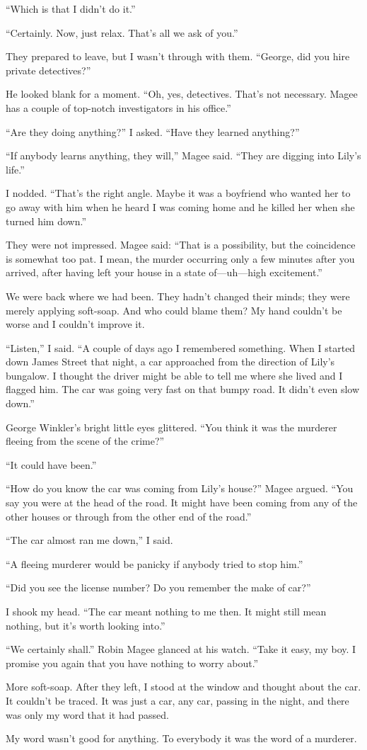 {“Which is that I didn’t do it.”

“Certainly. Now, just relax. That’s all we ask of you.”

They prepared to leave, but I wasn’t through with them. “George, did you hire private detectives?”

He looked blank for a moment. “Oh, yes, detectives. That’s not necessary. Magee has a couple of top-notch investigators in his office.”

“Are they doing anything?” I asked. “Have they learned anything?”

“If anybody learns anything, they will,” Magee said. “They are digging into Lily’s life.”

I nodded. “That’s the right angle. Maybe it was a boyfriend who wanted her to go away with him when he heard I was coming home and he killed her when she turned him down.”

They were not impressed. Magee said: “That is a possibility, but the coincidence is somewhat too pat. I mean, the murder occurring only a few minutes after you arrived, after having left your house in a state of—uh—high excitement.”

We were back where we had been. They hadn’t changed their minds; they were merely applying soft-soap. And who could blame them? My hand couldn’t be worse and I couldn’t improve it.

“Listen,” I said. “A couple of days ago I remembered something. When I started down James Street that night, a car approached from the direction of Lily’s bungalow. I thought the driver might be able to tell me where she lived and I flagged him. The car was going very fast on that bumpy road. It didn’t even slow down.”

George Winkler’s bright little eyes glittered. “You think it was the murderer fleeing from the scene of the crime?”

“It could have been.”

“How do you know the car was coming from Lily’s house?” Magee argued. “You say you were at the head of the road. It might have been coming from any of the other houses or through from the other end of the road.”

“The car almost ran me down,” I said.

“A fleeing murderer would be panicky if anybody tried to stop him.”

“Did you see the license number? Do you remember the make of car?”

I shook my head. “The car meant nothing to me then. It might still mean nothing, but it’s worth looking into.”

“We certainly shall.” Robin Magee glanced at his watch. “Take it easy, my boy. I promise you again that you have nothing to worry about.”

More soft-soap. After they left, I stood at the window and thought about the car. It couldn’t be traced. It was just a car, any car, passing in the night, and there was only my word that it had passed.

My word wasn’t good for anything. To everybody it was the word of a murderer.

}

